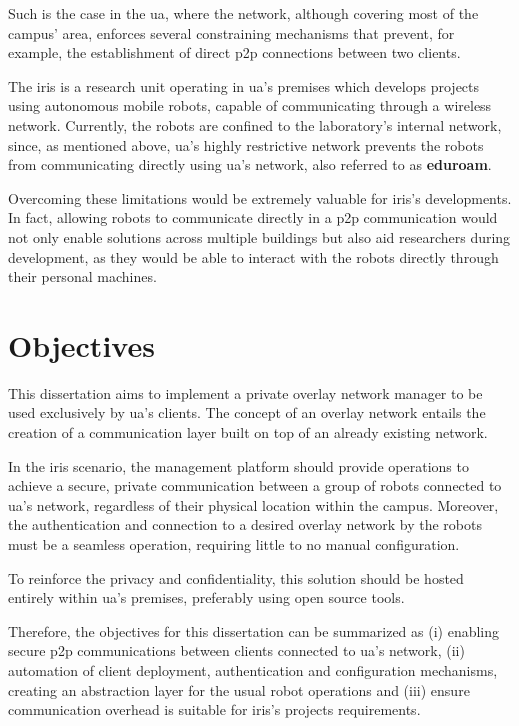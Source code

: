 \documentclass[11pt,twoside,a4paper]{report}
\begin{document}
Such is the case in the \ac{ua}, where the network, although covering most of the campus' area, enforces several constraining mechanisms that prevent, for example, the establishment of direct \ac{p2p} connections between two clients.

The \ac{iris} is a research unit operating in \ac{ua}'s premises which develops projects using autonomous mobile robots, capable of communicating through a wireless network. Currently, the robots are confined to the laboratory's internal network, since, as mentioned above, \ac{ua}'s highly restrictive network prevents the robots from communicating directly using \ac{ua}'s network, also referred to as \textbf{eduroam}.

Overcoming these limitations would be extremely valuable for \ac{iris}'s developments. In fact, allowing robots to communicate directly in a \ac{p2p} communication would not only enable solutions across multiple buildings but also aid researchers during development, as they would be able to interact with the robots directly through their personal machines.

\section{Objectives}

This dissertation aims to implement a private overlay network manager to be used exclusively by \ac{ua}'s clients. The concept of an overlay network entails the creation of a communication layer built on top of an already existing network.

In the \ac{iris} scenario, the management platform should provide operations to achieve a secure, private communication between a group of robots connected to \ac{ua}'s network, regardless of their physical location within the campus. Moreover, the authentication and connection to a desired overlay network by the robots must be a seamless operation, requiring little to no manual configuration.

To reinforce the privacy and confidentiality, this solution should be hosted entirely within \ac{ua}'s premises, preferably using open source tools.

Therefore, the objectives for this dissertation can be summarized as (i) enabling secure \ac{p2p} communications between clients connected to \ac{ua}'s network, (ii) automation of client deployment, authentication and configuration mechanisms, creating an abstraction layer for the usual robot operations and (iii) ensure communication overhead is suitable for \ac{iris}'s projects requirements.
\end{document}
